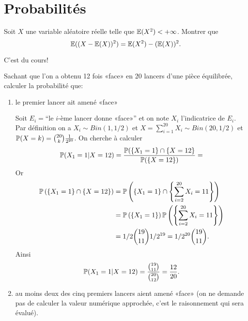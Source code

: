 \documentclass{tp_um}
\begin{document}
\section{Probabilités}

\exo{}Soit $X$ une variable aléatoire réelle telle que $\E(X^2) < +\infty$. Montrer que 
\[
	\E( (X-\E(X))^2) = \E(X^2) - (\E(X))^2.
\]

C'est du cours!




\exo{}Sachant que l'on a obtenu 12 fois «face» en 20 lancers d'une pièce équilibrée, calculer la probabilité que:
\begin{enumerate}
	\item le premier lancer ait amené «face»

		\bigskip

		Soit $E_i =$``le $i$-ème lancer donne «face»'' et on note $X_i$ l'indicatrice de $E_i$. Par définition on a $X_i \sim Bin(1,1/2)$ et $X=\sum_{i=1}^{20} X_i \sim Bin(20,1/2)$ et $\P( X=k) = \binom{20}{k} \frac{1}{2^{20}}$. 
On cherche à calculer 
\[\P(X_1 =1 | X= 12) = \frac{\P( \{X_1=1\} \cap \{X= 12\} }{\P( \{X=12\} )} = \]
Or
\begin{align*}
	\P\left(\left\{ X_1=1\right\} \cap\left\{ X= 12\right\}\right)  &= \P\left( \left\{ X_1=1\right\} \cap\left\{\sum_{i=2}^{20} X_i=11 \right\} \right) \\& = \P\left( \left\{ X_1=1\right\}\right)  \P\left( \left\{\sum_{i=2}^{20} X_i =11 \right\} \right)  \\ &= 1/2 \binom{19}{11} 1/2^{19} = 1/2^{20}\binom{19}{11}. 
\end{align*}
Ainsi
\[
	\P(X_1 =1 | X= 12) = \frac{ \binom{19}{11}}{ \binom{20}{12}} = \frac{ 12 }{20}.
\]
		\bigskip

	\item au moins deux des cinq premiers lancers aient amené «face» (on ne demande pas de calculer la valeur numérique approchée, c'est le raisonnement qui sera évalué).

		\bigskip


\end{enumerate}
\end{document}
